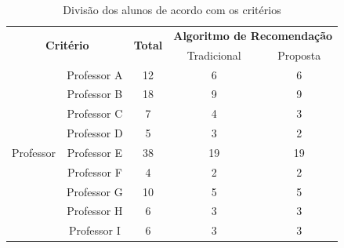 \begin{table}[ht]
\footnotesize
\caption[Divisão dos alunos de acordo com os critérios]{Divisão dos alunos de acordo com os critérios}
\label{tab:divisao-alunos-experimento}
\centering
\begin{tabular}{ccccc}
  \multicolumn{2}{c}{\multirow{2}{*}{\textbf{Critério}}}           & \multirow{2}{*}{\textbf{Total}}           & \multicolumn{2}{c}{\textbf{Algoritmo de Recomendação}} \\
                                        &                          &                                           & Tradicional          & Proposta                        \\
  \hline
  \multirow{12}{*}{Professor}           & Professor A              & 12                                        & 6                    & 6                               \\
                                        & Professor B              & 18                                        & 9                    & 9                               \\
                                        & Professor C              & 7                                         & 4                    & 3                               \\
                                        & Professor D              & 5                                         & 3                    & 2                               \\
                                        & Professor E              & 38                                        & 19                   & 19                              \\
                                        & Professor F              & 4                                         & 2                    & 2                               \\
                                        & Professor G              & 10                                        & 5                    & 5                               \\
                                        & Professor H              & 6                                         & 3                    & 3                               \\
                                        & Professor I              & 6                                         & 3                    & 3                               \\

\end{tabular}
\end{table}
